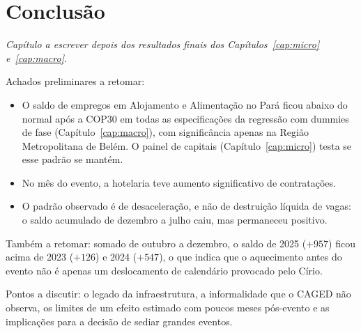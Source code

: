 \chapter{Conclusão}\label{cap:conclusao}

\textit{Capítulo a escrever depois dos resultados finais dos Capítulos~\ref{cap:micro} e~\ref{cap:macro}.}

Achados preliminares a retomar:
\begin{itemize}
  \item O saldo de empregos em Alojamento e Alimentação no Pará ficou abaixo do normal após a COP30 em todas
        as especificações da regressão com dummies de fase (Capítulo~\ref{cap:macro}), com significância apenas na
        Região Metropolitana de Belém. O painel de capitais (Capítulo~\ref{cap:micro}) testa se esse padrão se mantém.
  \item No mês do evento, a hotelaria teve aumento significativo de contratações.
  \item O padrão observado é de desaceleração, e não de destruição líquida de vagas: o saldo acumulado de
        dezembro a julho caiu, mas permaneceu positivo.
\end{itemize}

Também a retomar: somado de outubro a dezembro, o saldo de 2025 ($+957$) ficou acima de 2023 ($+126$) e
2024 ($+547$), o que indica que o aquecimento antes do evento não é apenas um deslocamento de calendário
provocado pelo Círio.

Pontos a discutir: o legado da infraestrutura, a informalidade que o CAGED não observa, os limites de um
efeito estimado com poucos meses pós-evento e as implicações para a decisão de sediar grandes eventos.
